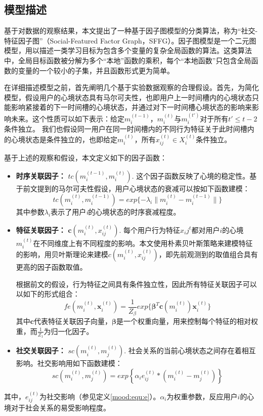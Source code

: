 \subsection{模型描述}
\label{mood:sec:ModelDescription}

基于对数据的观察结果，本文提出了一种基于因子图模型的分类算法，称为``社交-特征因子图''（Social-Featured Factor Graph，SFFG）。因子图模型是一个二元图模型，用以描述一类学习目标为包含多个变量的复杂全局函数的算法。这类算法中，全局目标函数被分解为多个``本地''函数的乘积，每个``本地函数''只包含全局函数的变量的一个较小的子集，并且函数形式更为简单\cite{factorgraph, followback}。

在详细描述模型之前，首先阐明几个基于实验数据观察的合理假设。首先，为简化模型，假设用户的心境状态具有马尔可夫性，也即用户上一时间槽内的心境状态只能影响紧接着的下一时间槽的心境状态，并通过对下一时间槽心境状态的影响来影响未来。这个性质可以如下表示：给定$m_i^{(t-1)}$，$m_i^{(t)}$与$m_i^{(t')}$对于所有$t' \leq t-2$条件独立。
我们也假设同一用户在同一时间槽内的不同行为特征关于此时间槽内的心境状态是条件独立的，也即给定$m_i^{(t)}$，所有$x_{ij}^{(t)} \in X_i^{(t)}$条件独立。 

基于上述的观察和假设，本文定义如下的因子函数：

\begin{itemize}
  \item \textbf{时序关联因子：} $tc(m_i^{(t-1)}, m_i^{(t)})$. 这个因子函数反映了心境的稳定性。基于前文提到的马尔可夫性假设，用户心境状态的衰减可以按如下函数建模：
  \begin{equation}
    tc(m_i^{(t)}, m_i^{(t-1)}) = exp\{-\lambda _i \| m_i^{(t)} -m_i^{(t-1)} \| \}
    \label{mood:tc}
  \end{equation}
  其中参数$\lambda_i$表示了用户\textit{i}的心境状态的时序衰减程度。  
  \item \textbf{特征关联因子：} $\textbf{c}(m_i^{(t)}, x_{ij}^{(t)})$. 每个用户行为特征$x_ij^{t}$都对用户$i$的心境$m_i^{(t)}$在不同维度上有不同程度的影响。本文使用朴素贝叶斯策略来建模特征的影响，用贝叶斯理论来建模$c(m_i^{(t)}, x_{ij}^{(t)})$，即先前观测到的取值组合具有更高的因子函数取值。

根据前文的假设，行为特征之间具有条件独立性，因此所有特征关联因子可以以如下的形式组合：
\begin{equation}
fe(m_i^{(t)}, \mathbf{x}_i^{(t)}) = \frac{1}{Z_\beta}exp\{\mathbf{\beta}^T\mathbf{c}(m_i^{(t)}) \mathbf{x}_i^{(t)}\}
\label{mood:fe}
\end{equation}
其中$\textbf{c}$代表特征关联因子向量，$\mathbf{\beta}$是一个权重向量，用来控制每个特征的相对权重，而$\frac{1}{Z_1}$为归一化因子。 

\item \textbf{社交关联因子：} $sc(m_i^{(t)}, m_j^{(t)})$. 社会关系的当前心境状态之间存在着相互影响。社交影响用如下函数建模：
\begin{equation}
sc(m_i^{(t)}, m_j^{(t)}) = exp\left\{ \alpha_i e_{ij}^{(t)} * (m_i^{(t)} -m_j^{(t)}) \right\}
\label{mood:sc}
\end{equation}
\end{itemize}
其中，$e_{ij}^{(t)}$为社交影响（参见定义\ref{mood:equ:e}）。$\alpha_i$为权重参数，反应用户$i$的心境对于社会关系的易受影响程度。

